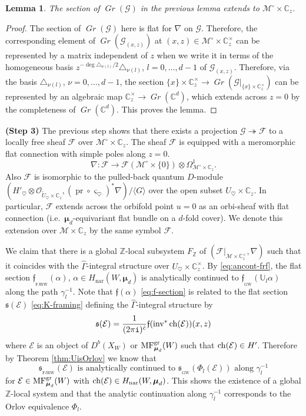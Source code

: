 \documentclass[11pt]{amsart}
\newtheorem{lem}[thm]{Lemma} %
\theoremstyle{definition} %
\theoremstyle{remark} %
\newcommand{\CC}{\mathbb C}
\newcommand{\UU}{\mathbb U}
\newcommand{\ZZ}{\mathbb Z}
\newcommand{\nar}{\operatorname{nar}}
\newcommand{\ch}{{\rm ch}}
\def\MFhom{\operatorname{{MF}}}
\newcommand{\bmu}{\boldsymbol{\mu}}
\newcommand{\cO}{\mathcal{O}}
\newcommand{\cM}{\mathcal{M}}
\newcommand{\cMo}{\mathcal{M}^\circ}
\newcommand{\cE}{\mathcal{E}}
\newcommand{\cF}{\mathcal{F}}
\newcommand{\cG}{\mathcal{G}}
\newcommand{\frs}{\mathfrak{s}}
\newcommand{\frf}{\mathfrak{f}}
\newcommand{\hc}{\hat{c}}
\newcommand{\sFJRW}{\operatorname{_{FJRW}}}
\newcommand{\sGW}{\operatorname{_{GW}}}
\newcommand{\Grass}{\operatorname{\mathit{Gr}}} %
\newcommand{\inv}{\operatorname{inv}}
\newcommand{\pr}{\operatorname{pr}}
\newcommand{\hGamma}{\widehat{\Gamma}}
\newcommand{\tU}{\widetilde{U}}
\newcommand{\iu}{\mathtt{i}}
\begin{document}
\begin{lem} 
The section of $\Grass(\cG)$ in the previous lemma  
extends to $\cMo\times \CC_z$. 
\end{lem} 
\begin{proof} 
The section of $\Grass(\cG)$ 
here is flat for $\nabla$ on $\cG$. 
Therefore, the corresponding element of 
$\Grass(\cG_{(x,z)})$ at $(x,z)\in \cMo\times \CC^\times_z$ 
can be represented by a matrix independent of $z$ 
when we write it in terms of the homogeneous 
basis $z^{-\deg \triangle_{\nu(l)}/2}\triangle_{\nu(l)}$, 
$l=0,\dots,d-1$ of $\cG_{(x,z)}$. 
Therefore, via the basis $\triangle_{\nu(l)}$, 
$\nu=0,\dots,d-1$, the section $\{x\}\times \CC^\times_z \to 
\Grass(\cG|_{\{x\} \times \CC_z^\times})$ 
can be represented by an algebraic map 
$\CC^\times_z \to \Grass(\CC^d)$,  
which extends across $z=0$ by the completeness of 
$\Grass(\CC^d)$. 
This proves the lemma. 
\end{proof} 

\vspace{5pt} 
\noindent 
{\bf (Step 3)} The previous step shows that there exists a 
projection $\cG \twoheadrightarrow \cF$ 
to a locally free sheaf $\cF$ over $\cMo\times \CC_z$. 
The sheaf $\cF$ is equipped with a meromorphic 
flat connection with simple poles along $z=0$. 
\[
\nabla \colon \cF \to \cF(\cMo\times\{0\}) 
\otimes \Omega_{\cMo\times \CC_z}^1.   
\]
Also $\cF$ is isomorphic to the pulled-back quantum $D$-module 
$(H'_{\heartsuit} \otimes \cO_{\tU_{\heartsuit} \times \CC_z}, 
(\pr \circ \varsigma_\heartsuit)^* \nabla)/
\langle G\rangle$ over the open subset $U_\heartsuit \times \CC_z$. 
In particular, 
$\cF$ extends across the orbifold point $u=0$ 
as an orbi-sheaf with flat connection 
(i.e.\ $\bmu_d$-equivariant flat bundle on a $d$-fold cover). 
We denote this extension over $\cM\times \CC_z$ 
by the same symbol $\cF$. 

We claim that there is a global $\ZZ$-local 
subsystem $F_\ZZ$ of $(\cF|_{\cM\times\CC_z^\times},\nabla)$ 
such that it coincides with the $\hGamma$-integral 
structure over $U_{\heartsuit}\times \CC_z^\times$. 
By \eqref{eq:ancont-frf}, the flat section 
$\frf_{\sFJRW}(\alpha)$, $\alpha\in H_{\nar}(W,\bmu_d)$ 
is analytically continued to 
$\frf_{\sGW}(\UU_l \alpha)$ along the path $\gamma_l^{-1}$. 
Note that $\frf(\alpha)$ \eqref{eq:f-section} is related 
to the flat section $\frs(\cE)$ \eqref{eq:K-framing} 
defining the $\hGamma$-integral structure by 
\[
\frs(\cE) = 
\frac{1}{(2\pi\iu)^{\hc}} 
\frf(\inv^* \ch(\cE)) (x,z) 
\]
where $\cE$ is an object of $D^b(X_W)$ 
or $\MFhom^{\rm gr}_{\bmu_d}(W)$ 
such that $\ch(\cE) \in H'$. 
Therefore by Theorem \ref{thm:UisOrlov} we know that 
\begin{equation} 
\label{eq:ancont-frs} 
\frs_{\sFJRW}(\cE) \text{ is analytically continued to } 
\frs_{\sGW}(\Phi_l(\cE)) 
\text{ along }\gamma_l^{-1} 
\end{equation} 
for $\cE\in \MFhom^{\rm gr}_{\bmu_d}(W)$ with 
$\ch(\cE) \in H_{\nar}(W,\bmu_d)$. 
This shows the existence of a global $\ZZ$-local system 
and that the analytic continuation along $\gamma_l^{-1}$ 
corresponds to the Orlov equivalence $\Phi_l$.  
\end{document}

